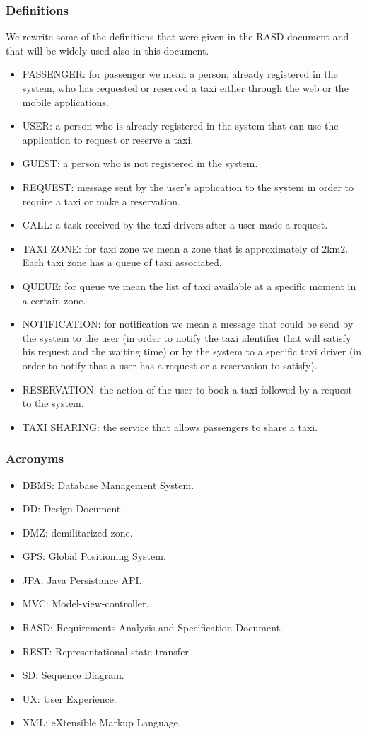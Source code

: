 \subsubsection{Definitions}
	We rewrite some of the definitions that were given in the RASD document and that will be widely used also in this document. 
	\begin{itemize}
		\item PASSENGER: for passenger we mean a person, already registered in the system, who has requested or reserved a taxi either through the web or the mobile applications.
		\item USER: a person who is already registered in the system that can use the application to request or reserve a taxi.
		\item GUEST:  a person who is not registered in the system.
		\item REQUEST: message sent by the user's application to the system in order to require a taxi or make a reservation.
		\item CALL: a task received by the taxi drivers after a user made a request.
		\item TAXI ZONE: for taxi zone we mean a zone that is approximately of 2km2. Each taxi zone has a queue of taxi associated. 
		\item QUEUE: for queue we mean the list of taxi available at a specific moment in a certain zone.
		\item NOTIFICATION: for notification we mean a message that could be send by the system to the user (in order to notify the taxi identifier that will satisfy his request and the waiting time) or by the system to a specific taxi driver (in order to notify that a user has a request or a reservation to satisfy).
		\item RESERVATION: the action of the user to book a taxi followed by a request to the system.
		\item TAXI SHARING: the service that allows passengers to share a taxi.
	\end{itemize}

\subsubsection{Acronyms}
	\begin{itemize}
		\item DBMS: Database Management System.
		\item DD: Design Document.
		\item DMZ: demilitarized zone.
		\item GPS: Global Positioning System.
		\item JPA: Java Persistance API. 
		\item MVC: Model-view-controller.
	    \item RASD: Requirements Analysis and Specification Document.
	    \item REST: Representational state transfer.
		\item SD: Sequence Diagram.
		\item UX: User Experience.
		\item XML: eXtensible Markup Language.
	\end{itemize}